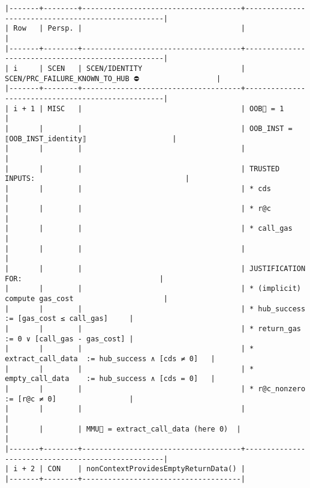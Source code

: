 \documentclass[varwidth=\maxdimen,margin=0.5cm,multi={verbatim}]{standalone}
\begin{document}
\begin{verbatim}
|-------+--------+-------------------------------------+---------------------------------------------------|
| Row   | Persp. |                                     |                                                   |
|-------+--------+-------------------------------------+---------------------------------------------------|
| i     | SCEN   | SCEN/IDENTITY                       | SCEN/PRC_FAILURE_KNOWN_TO_HUB ⛔                  |
|-------+--------+-------------------------------------+---------------------------------------------------|
| i + 1 | MISC   |                                     | OOB🏴 = 1                                         |
|       |        |                                     | OOB_INST = ⟦OOB_INST_identity⟧                    |
|       |        |                                     |                                                   |
|       |        |                                     | TRUSTED INPUTS:                                   |
|       |        |                                     | * cds                                             |
|       |        |                                     | * r@c                                             |
|       |        |                                     | * call_gas                                        |
|       |        |                                     |                                                   |
|       |        |                                     | JUSTIFICATION FOR:                                |
|       |        |                                     | * (implicit) compute gas_cost                     |
|       |        |                                     | * hub_success        := [gas_cost ≤ call_gas]     |
|       |        |                                     | * return_gas         := 0 ∨ [call_gas - gas_cost] |
|       |        |                                     | * extract_call_data  := hub_success ∧ [cds ≠ 0]   |
|       |        |                                     | * empty_call_data    := hub_success ∧ [cds = 0]   |
|       |        |                                     | * r@c_nonzero        := [r@c ≠ 0]                 |
|       |        |                                     |                                                   |
|       |        | MMU🏴 = extract_call_data (here 0)  |                                                   |
|-------+--------+-------------------------------------+---------------------------------------------------|
| i + 2 | CON    | nonContextProvidesEmptyReturnData() |
|-------+--------+-------------------------------------|
\end{verbatim}
\end{document}
